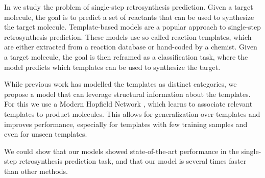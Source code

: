 
In \citep{seidlImprovingFewZeroShot2022} we study the problem of single-step
retrosynthesis prediction. Given a target molecule, the goal is to predict a
set of reactants that can be used to synthesize the target molecule.
Template-based models are a popular approach to single-step retrosynthesis
prediction. These models use so called reaction templates, which are
either extracted from a reaction database or hand-coded by a chemist.
Given a target molecule, the goal is then reframed as a classification task,
where the model predicts which templates can be used to synthesize the target.

While previous work has modelled the templates as distinct categories, we
propose a model that can leverage structural information about the templates.
For this we use a Modern Hopfield Network \citep{ramsauerHopfieldNetworksAll2020}, which
learns to associate relevant templates to product molecules.
This allows for generalization over templates and improves performance, especially
for templates with few training samples and even for unseen templates.

We could show that our models showed state-of-the-art performance in
the single-step retrosynthesis prediction task, and that our model is several
times faster than other methods.